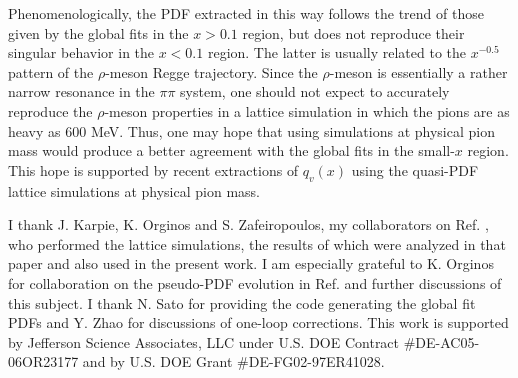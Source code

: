 \documentclass[aps,prd,twocolumn,showpacs,preprintnumbers,superscriptaddress]{revtex4-1}
\begin{document}
       Phenomenologically,  
    the  PDF extracted in this way  follows the trend of  those
    given by the   global fits in the $x>0.1$ region,  but 
    does not reproduce their  singular behavior in the $x<0.1$ region.  %
    The latter is usually related to the $x^{-0.5}$ pattern of the $\rho$-meson %
    Regge trajectory. Since the $\rho$-meson is essentially a rather narrow %
    resonance in the $\pi \pi$ system,  %
    one should not expect to accurately reproduce the $\rho$-meson  %
    properties  in a lattice simulation in which the pions %
    are as heavy as 600 MeV.  Thus,  one may hope  that using simulations %
    at physical pion mass would produce a better agreement with the global fits in the  %
    small-$x$ region.  This hope is supported by recent extractions  \cite{Alexandrou:2018pbm,Chen:2018xof}  %
    of $q_v (x)$ using  the quasi-PDF lattice simulations at physical pion mass. %
    

    
\acknowledgements



I  thank J. Karpie, K. Orginos and S. Zafeiropoulos,
my collaborators on  Ref. \cite{Orginos:2017kos}, 
 who performed the 
 lattice simulations,   the  results of which  were  analyzed in that paper 
 and also  used    in the present work. 
I am  especially  grateful to 
K. Orginos for  collaboration on  the pseudo-PDF evolution
in Ref.  \cite{Orginos:2017kos} and further discussions of this subject.
I thank  N. Sato 
for  providing the code generating 
the global fit PDFs  and Y. Zhao for discussions of one-loop corrections. 
This work is supported by Jefferson Science Associates,
 LLC under  U.S. DOE Contract \#DE-AC05-06OR23177 
and  by U.S. DOE Grant   \mbox{\#DE-FG02-97ER41028. }
\end{document}
